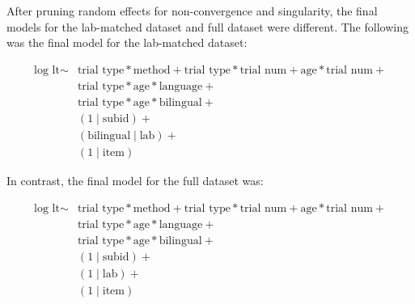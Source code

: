 \documentclass[,man,floatsintext]{apa6}
\begin{document}
After pruning random effects for non-convergence and singularity, the final models for the lab-matched dataset and full dataset were different. The following was the final model for the lab-matched dataset:

\begin{equation}
\begin{split}
\text{log lt} \sim & \text{trial type} * \text{method} + \text{trial type} * \text{trial num} + \text{age} * \text{trial num} + \\
& \text{trial type} * \text{age} * \text{language} + \\
& \text{trial type} * \text{age} * \text{bilingual} + \\
& (1 \mid \text{subid}) + \\
& (\text{bilingual} \mid \text{lab}) + \\
& (1 \mid \text{item})
\end{split}
\end{equation}

In contrast, the final model for the full dataset was:

\begin{equation}
\begin{split}
\text{log lt} \sim & \text{trial type} * \text{method} + \text{trial type} * \text{trial num} + \text{age} * \text{trial num} + \\
& \text{trial type} * \text{age} * \text{language} + \\
& \text{trial type} * \text{age} * \text{bilingual} + \\
& (1 \mid \text{subid}) + \\
& (1 \mid \text{lab}) + \\
& (1 \mid \text{item})
\end{split}
\end{equation}
\end{document}
